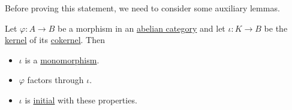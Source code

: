 \documentclass[../../../main]{subfiles}
\begin{document}
Before proving this statement, we need to consider some auxiliary lemmas.
\begin{lemma} \label{lemma:image-coimage-properties}
  Let \(\varphi: A \to B\) be a morphism in an \hyperref[def:abelian-category]{abelian category} and let \(\iota: K \to B\) be the \hyperref[def:categorical-kernel]{kernel} of its \hyperref[def:categorical-cokernel]{cokernel}. Then
  \begin{itemize}
    \item \(\iota\) is a \hyperref[def:mono-epi-morphism]{monomorphism}.
    \item \(\varphi\) factors through \(\iota\).
    \item \(\iota\) is \hyperref[def:initial-terminal-object]{initial} with these properties.
  \end{itemize}
\end{lemma}
\end{document}
